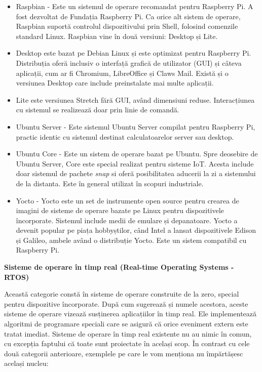 \begin{itemize}
	\item Raspbian - Este un sistemul de operare recomandat pentru Raspberry
		Pi. A fost dezvoltat de Fundația Raspberry Pi. Ca orice alt
		sistem de operare, Raspbian suportă controlul dispozitivului
		prin Shell, folosind comenzile standard Linux. Raspbian vine în
		două versiuni: Desktop și Lite.
	\item Desktop este bazat pe Debian Linux și este optimizat pentru
		Raspberry Pi. Distribuția oferă inclusiv o interfață grafică de
		utilizator (GUI) și câteva aplicații, cum ar fi Chromium,
		LibreOffice și Claws Mail. Există și o versiunea Desktop care include
		preinstalate mai multe aplicații.
	\item Lite este versiunea Stretch fără GUI, având dimensiuni
		reduse. Interacțiunea cu sistemul se realizează doar prin linie
		de comandă.
	\item Ubuntu Server - Este sistemul Ubuntu Server compilat pentru Raspberry Pi, 
		practic identic cu sistemul destinat calculatoarelor server sau desktop.
	\item Ubuntu Core - Este un sistem de operare bazat pe Ubuntu. Spre deosebire
		de Ubuntu Server, Core este special realizat pentru sisteme IoT.
		Acesta include doar sistemul de pachete \textit{snap} si oferă posibilitatea
		aducerii la zi a sistemului de la distanta. Este în general utilizat 
		în scopuri industriale.
	\item Yocto - Yocto este un set de instrumente open source pentru
		crearea de imagini de sisteme de operare bazate pe Linux pentru
		dispozitivele încorporate. Sistemul include medii de emulare și
		depanatoare. Yocto a devenit popular pe piața hobbyștilor, când
		Intel a lansat dispozitivele Edison și Galileo, ambele având o
		distribuție Yocto. Este un sistem compatibil cu Raspberry Pi.
\end{itemize}

\textbf{Sisteme de operare în timp real (Real-time Operating Systems - RTOS)}

Această categorie constă în sisteme de operare construite de la zero, special
pentru dispozitive încorporate. După cum sugerează și numele acestora, aceste
sisteme de operare vizează susținerea aplicațiilor în timp real. Ele
implementează algoritmi de programare speciali care se asigură că orice
eveniment extern este tratat imediat. Sisteme de operare în timp real existente
nu au nimic în comun, cu excepția faptului că toate sunt proiectate în același
scop. În contrast cu cele două categorii anterioare, exemplele pe care le vom
menționa nu împărtășesc același nucleu:

